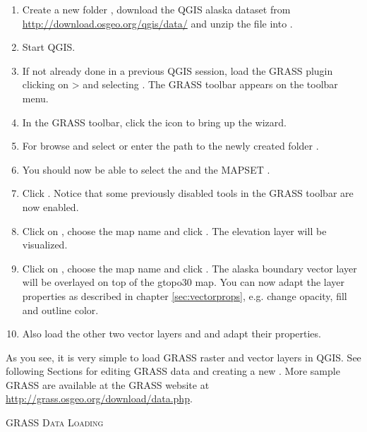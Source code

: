 \begin{enumerate}
  \item Create a new folder , download the QGIS alaska
  dataset  from
  \url{http://download.osgeo.org/qgis/data/} and unzip the file into
  . 
  \item Start QGIS.
  \item If not already done in a previous QGIS session, load the GRASS plugin
  clicking on  >  and
  selecting . The GRASS toolbar appears on the toolbar menu.
  \item In the GRASS toolbar, click the  icon to bring up the  wizard.
  \item For  browse and select or enter the path to the
  newly created folder .
  \item You should now be able to select the 
  and the MAPSET . 
  \item Click . Notice that some previously disabled tools in the 
  GRASS toolbar are now enabled.
  \item Click on ,
  choose the map name  and click . The elevation
  layer will be visualized.
  \item Click on ,
  choose the map name  and click . The alaska
  boundary vector layer will be overlayed on top of the gtopo30 map. You can
  now adapt the layer properties as described in chapter \ref{sec:vectorprops},
  e.g. change opacity, fill and outline color.
  \item Also load the other two vector layers  and
   and adapt their properties.
\end{enumerate}

As you see, it is very simple to load GRASS raster and vector layers in QGIS. 
See following Sections for editing GRASS data and creating a new 
. More sample GRASS  are available at 
the GRASS website at \url{http://grass.osgeo.org/download/data.php}.

\begin{Tip}\caption{\textsc{GRASS Data Loading}}
\end{Tip} 

